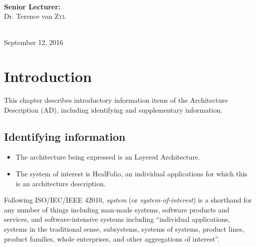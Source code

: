 \documentclass[10pt,oneside]{report}
\begin{document}
\begin{titlepage}
\begin{minipage}{0.4\textwidth}
\begin{flushleft}
\end{flushleft}

\end{minipage} \\[0.5cm]

\begin{minipage}{0.4\textwidth}

\begin{flushright} \large

\textbf{Senior Lecturer:} \\[0.2cm]

Dr. Terence van \textsc{Zyl} \\

\end{flushright}

\end{minipage} \\[0.5cm]

{\large September 12, 2016} 
    
\end{titlepage}

\newpage
\tableofcontents


\setlength\parindent{24pt}

\chapter{Introduction}\label{ad:info}

This chapter describes introductory information items of the Architecture Description (AD), including identifying and supplementary information.

\section{Identifying information}\label{ad:idinfo}

\begin{itemize}
\item The architecture being expressed is an Layered Architecture.
\item The system of interest is HealFolio, an individual applications for which this is an architecture description.
\end{itemize}

Following ISO/IEC/IEEE 42010, \textit{system} (or \textit{system-of-interest}) is a shorthand for any number of things including man-made systems, software products and services, and software-intensive systems including ``individual applications, systems in the traditional sense, subsystems, systems of systems, product lines, product families, whole enterprises, and other aggregations of interest''. 
\end{document}
